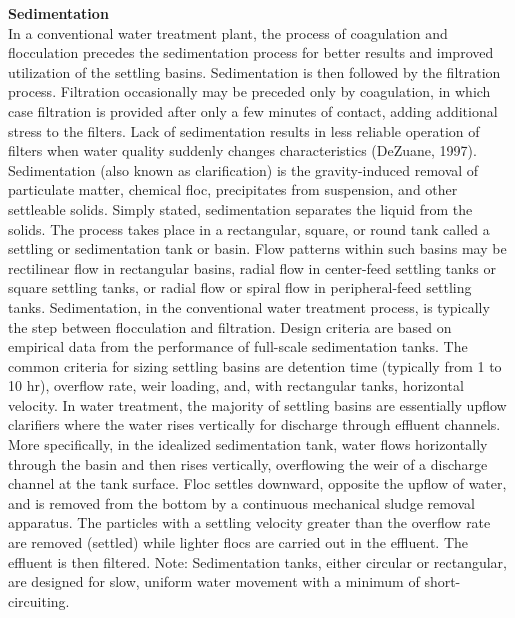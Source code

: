 \textbf{Sedimentation}\\
In a conventional water treatment plant, the process of coagulation and flocculation precedes the sedimentation process for better results and improved utilization of the settling basins. Sedimentation is then followed by the filtration process. Filtration occasionally may be preceded only by coagulation, in which case filtration is provided after only a few minutes of contact, adding additional stress to the filters. Lack of sedimentation results in less reliable operation of filters when water quality suddenly changes characteristics (DeZuane, 1997).
Sedimentation (also known as clarification) is the gravity-induced removal of particulate matter, chemical floc, precipitates from suspension, and other settleable solids. Simply stated, sedimentation separates the liquid from the solids. The process takes place in a rectangular, square, or round tank called a settling or sedimentation tank or basin. Flow patterns within such basins may be rectilinear flow in rectangular basins, radial flow in center-feed settling tanks or square settling tanks, or radial flow or spiral flow in peripheral-feed settling tanks.
Sedimentation, in the conventional water treatment process, is typically the step between flocculation and filtration. Design criteria are based on empirical data from the performance of full-scale sedimentation tanks. The common criteria for sizing settling basins are detention time (typically from 1 to 10 hr), overflow rate, weir loading, and, with rectangular tanks, horizontal velocity.
In water treatment, the majority of settling basins are essentially upflow clarifiers where the water rises vertically for discharge through effluent channels. More specifically, in the idealized sedimentation tank, water flows horizontally through the basin and then rises vertically, overflowing the weir of a discharge channel at the tank
surface. Floc settles downward, opposite the upflow of water, and is removed from the bottom by a continuous mechanical sludge removal apparatus. The particles with a settling velocity greater than the overflow rate are removed (settled) while lighter flocs are carried out in the effluent. The effluent is then filtered.
Note: Sedimentation tanks, either circular or rectangular, are designed for slow, uniform water movement with a minimum of short-circuiting.\\

